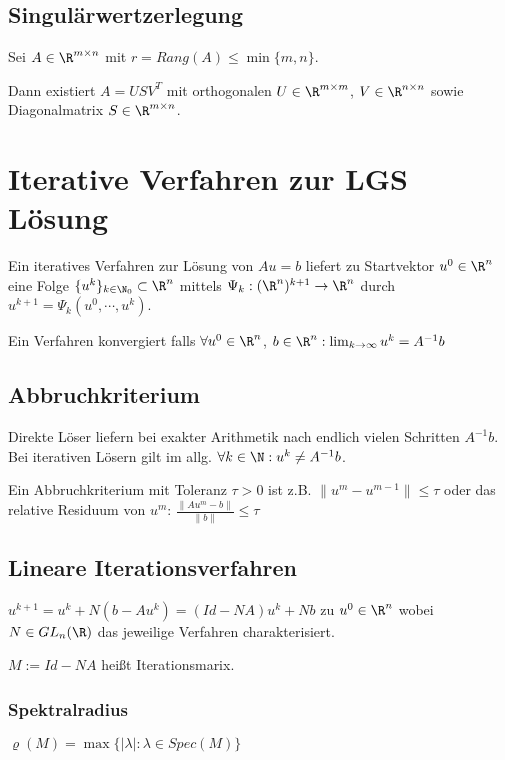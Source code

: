\subsection*{Singulärwertzerlegung}

Sei $A \in \R^{m \times n}$ mit $r=Rang(A) \leq \min\{m,n\}$.

Dann existiert $A=USV^T$ mit orthogonalen $U \in \R^{m \times m}$, $V \in \R^{n \times n}$ sowie Diagonalmatrix $S \in \R^{m \times n}$.

\section*{Iterative Verfahren zur LGS Lösung}

Ein iteratives Verfahren zur Lösung von $Au=b$ liefert zu Startvektor $u^0 \in \R^n$ eine Folge $\{u^k\}_{k\in \N_0} \subset \R^n$ mittels $\Psi_k : (\R^n)^{k+1} \rightarrow \R^n$ durch $u^{k+1} = \Psi_k(u^0, \cdots, u^k)$.

Ein Verfahren konvergiert falls $\forall u^0 \in \R^n$, $b \in \R^n : \lim_{k\to \infty} u^k = A^{-1}b$

\subsection*{Abbruchkriterium}

Direkte Löser liefern bei exakter Arithmetik nach endlich vielen Schritten $A^{-1}b$. Bei iterativen Lösern gilt im allg. $\forall k \in \N : u^k \neq A^{-1}b$.

Ein Abbruchkriterium mit Toleranz $\tau > 0$ ist z.B. $\|u^m-u^{m-1}\| \leq \tau$ oder das relative Residuum von $u^m$: $\frac{\|Au^m-b\|}{\|b\|} \leq \tau$

\subsection*{Lineare Iterationsverfahren}

$u^{k+1} = u^k + N(b-Au^k) = (Id - NA)u^k + Nb$ zu $u^0 \in \R^n$ wobei $N \in GL_n(\R)$ das jeweilige Verfahren charakterisiert.

$M := Id - NA$ heißt Iterationsmarix.

\subsubsection*{Spektralradius}

$\varrho(M) = \max\{|\lambda| : \lambda \in Spec(M)\}$

